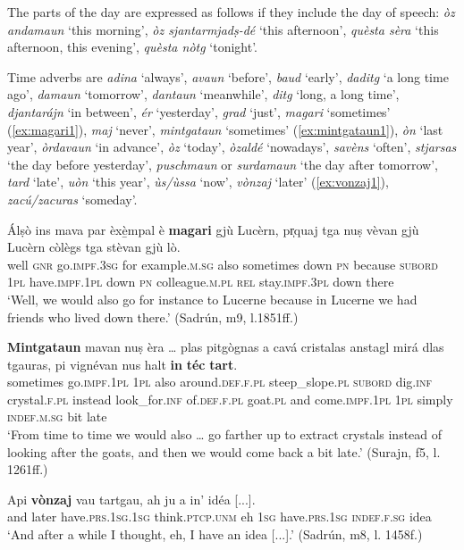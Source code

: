 The parts of the day are expressed as follows if they include the day of speech: \textit{òz andamaun} `this morning', \textit{òz sjantarmjadṣ-dé} `this afternoon', \textit{quèsta sèra} `this afternoon, this evening', \textit{quèsta nòtg} `tonight'.

Time adverbs are \textit{adina} `always', \textit{avaun} `before', \textit{baud} `early', \textit{daditg} `a long time ago', \textit{damaun} `tomorrow', \textit{dantaun} `meanwhile', \textit{ditg} `long, a long time', \textit{djantarájn} `in between', \textit{ér} `yesterday', \textit{grad} `just', \textit{magari} `sometimes' (\ref{ex:magari1}), \textit{maj} `never', \textit{mintgataun} `sometimes' (\ref{ex:mintgataun1}), \textit{òn} `last year', \textit{òrdavaun} `in advance', \textit{òz} `today', \textit{òzaldé} `nowadays', \textit{savèns} `often', \textit{stjarsas} `the day before yesterday', \textit{puschmaun} or \textit{surdamaun} `the day after tomorrow', \textit{tard} `late', \textit{uòn} `this year', \textit{ùs/ùssa} `now', \textit{vònzaj} `later' (\ref{ex:vonzaj1}), \textit{zacú/zacuras} `someday'.

\ea
\label{ex:magari1}
	\gll  Álṣò ins mava par èxè̱mpal è \textbf{magari} gjù Lucèrn, pr̩quaj tga nuṣ vèvan gjù Lucèrn còlègs tga stèvan gjù lò.\\
well \textsc{gnr} go.\textsc{impf.3sg} for example\textsc{.m.sg} also sometimes down \textsc{pn} because \textsc{subord} \textsc{1pl} have.\textsc{impf.1pl} down \textsc{pn} colleague.\textsc{m.pl} \textsc{rel} stay.\textsc{impf.3pl} down there\\
\glt `Well, we would also go for instance to Lucerne because in Lucerne we had friends who lived down there.' (Sadrún, m9, l.1851ff.)
\z

\ea
\label{ex:mintgataun1}
\gll \textbf{Mintgataun} mavan nuṣ èra … plas pitgògnas a cavá cristalas anstagl mirá dlas tgauras, pi vignévan nus halt \textbf{in} \textbf{téc} \textbf{tart}. \\
sometimes go.\textsc{impf.1pl} \textsc{1pl} also {} around.\textsc{def.f.pl}  steep\_slope.\textsc{pl} \textsc{subord} dig.\textsc{inf} crystal.\textsc{f.pl} instead look\_for.\textsc{inf} of.\textsc{def.f.pl} goat.\textsc{pl} and come.\textsc{impf.1pl} \textsc{1pl} simply \textsc{indef.m.sg} bit late \\
\glt `From time to time we would also … go farther up to extract crystals instead of looking after the goats, and then we would come back a bit late.' (Surajn, f5, l. 1261ff.)
\z

\ea
\label{ex:vonzaj1}
\gll Api \textbf{vònzaj} vau tartgau, ah ju a in’ idéa [...].   \\
and later have.\textsc{prs.1sg.1sg} think.\textsc{ptcp.unm} eh \textsc{1sg} have.\textsc{prs.1sg} \textsc{indef.f.sg} idea\\
\glt `And after a while I thought, eh, I have an idea [...].' (Sadrún, m8, l. 1458f.)
\z

